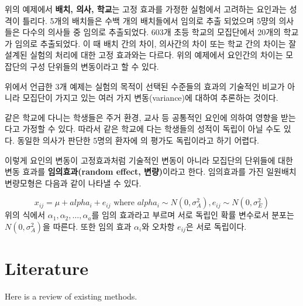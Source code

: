 \documentclass[
]{book}
\makeatletter
\newenvironment{kframe}{%
\medskip{}
\setlength{\fboxsep}{.8em}
 \def\at@end@of@kframe{}%
 \ifinner\ifhmode%
  \def\at@end@of@kframe{\end{minipage}}%
  \begin{minipage}{\columnwidth}%
 \fi\fi%
 \def\FrameCommand##1{\hskip\@totalleftmargin \hskip-\fboxsep
 \colorbox{shadecolor}{##1}\hskip-\fboxsep
     \hskip-\linewidth \hskip-\@totalleftmargin \hskip\columnwidth}%
 \MakeFramed {\advance\hsize-\width
   \@totalleftmargin\z@ \linewidth\hsize
   \@setminipage}}%
 {\par\unskip\endMakeFramed%
 \at@end@of@kframe}
\newenvironment{rmdblock}[1]
  {
  \begin{itemize}
  \renewcommand{\labelitemi}{
    \raisebox{-.7\height}[0pt][0pt]{
      {\setkeys{Gin}{width=3em,keepaspectratio}\texttt{[image: images/\#1]}}
    }
  }
  \setlength{\fboxsep}{1em}
  \begin{kframe}
  \item
  }
  {
  \end{kframe}
  \end{itemize}
  }
\newenvironment{rmdnote}
  {\begin{rmdblock}{note}}
  {\end{rmdblock}}
\makeatother
\begin{document}
위의 예제에서 \textbf{배치, 의사, 학교}는 고정 효과를 가정한 실험에서 고려하는 요인과는 성격이 틀리다. 5개의 배치들은 수백 개의 배치들에서 임의로 추출 되었으며 5먕의 의사들은 다수의 의사들 중 임의로 추출되었다. 603개 초등 학교의 모집단에서 20개의 학교가 임의로 추출되었다. 이 때 배치 간의 차이, 의사간의 차이 또는 학교 간의 차이는 잘 설계된 실험의 처리에 대한 고정 효과와는 다르다. 위의 예제에서 요인간의 차이는 모잡단의 구성 단위들의 변동이라고 할 수 있다.

위에서 언급한 3개 예제는 실험의 목적이 선택된 수준들의 효과의 기술적인 비교가 아니라 모집단이 가지고 있는 여러 가지 변동(variance)에 대하여 추론하는 것이다.

\begin{rmdnote}
같은 학교에 다니는 학생들은 주거 환경, 교사 등 공통적인 요인에 의하여 영향을 받는다고 가정할 수 있다. 따라서 같은 학교에 다는 학생들의 성적이 독립이 아닐 수도 있다. 동일한 의사가 판단한 5명의 환자에 의 평가도 독립이라고 하기 어렵다.\\
\end{rmdnote}

이렇게 요인의 변동이 고정효과처럼 기술적인 변동이 아니라 모집단의 단위들에 대한 변동 효과를 \textbf{임의효과(random effect, 변량)}이라고 한다. 임의효과를 가진 일원배치 변량모형은 다음과 같이 나타낼 수 있다.

\begin{equation}
x_{ij} = \mu + alpha_i + e_{ij} \text{ where } alpha_i \sim N(0,\sigma_A^2), e_{ij} \sim N(0,\sigma_E^2)
\label{eq:randommodel}
\end{equation}
위의 식에서 \(\alpha_1, \alpha_2, \dots, \alpha_a\)를 임의 효과라고 부르며 서로 독립인 확률 변수로서 분포는 \(N(0,\sigma_A^2)\)을 따른다. 또한 임의 효과 \(\alpha_i\)와 오차항 \(e_{ij}\)은 서로 독립이다.

\hypertarget{literature}{%
\chapter{Literature}\label{literature}}

Here is a review of existing methods.

  
\end{document}
